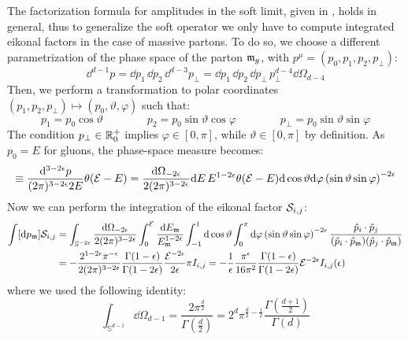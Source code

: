 The factorization formula for amplitudes in the soft limit, given in , holds in general, thus to generalize the soft operator we only have to compute integrated eikonal factors in the case of massive partons. To do so, we choose a different parametrization of the phase space of the parton $ \mathfrak{m}_g $, with $ p^\mu = (p_0 , p_1 , p_2 , p_\perp) $:
\begin{equation}
  \dd^{d-1} p = \dd p_1 \, \dd p_2 \, \dd^{d-3} p_\perp = \dd p_1 \, \dd p_2 \, \dd p_\perp \, p_\perp^{d-4} \dd \Omega_{d-4}
\end{equation}
Then, we perform a transformation to polar coordinates $ (p_1 , p_2 , p_\perp) \mapsto (p_0 , \vartheta , \varphi) $ such that:
\begin{equation}
  p_1 = p_0 \cos \vartheta
  \qquad \qquad
  p_2 = p_0 \sin \vartheta \cos \varphi
  \qquad \qquad
  p_\perp = p_0 \sin \vartheta \sin \varphi
\end{equation}
The condition $ p_\perp \in \mathbb{R}^+_0 $ implies $ \varphi \in [0,\pi] $, while $ \vartheta \in [0,\pi] $ by definition. As $ p_0 = E $ for gluons, the phase-space measure becomes:
\begin{equation}
  [\dd p] \equiv \frac{\dd^{3-2\de}p}{(2\pi)^{3-2\de}2E} \theta(\ema - E) = \frac{\dd \Omega_{-2\de}}{2(2\pi)^{3-2\de}} \dd E\, E^{1-2\de} \theta(\ema - E) \dd \cos \vartheta \dd \varphi \left( \sin \vartheta \sin \varphi \right)^{-2\de}
\end{equation}
Now we can perform the integration of the eikonal factor $ \mathcal{S}_{i,j} $:
\begin{equation*}
  \begin{split}
    \int [\mathrm{d} p_{\mathfrak{m}}] \mathcal{S}_{i,j}
    & = \int_{\mathbb{S}^{-2\epsilon}} \frac{\mathrm{d} \Omega_{-2\epsilon}}{2(2\pi)^{3-2\epsilon}} \int_0^{\mathcal{E}} \frac{\mathrm{d} E_{\mathfrak{m}}}{E_{\mathfrak{m}}^{1-2\epsilon}} \int_{-1}^1 \mathrm{d} \cos \vartheta \int_0^\pi \mathrm{d} \varphi \left( \sin \vartheta \sin \varphi \right)^{-2\epsilon} \frac{\hat{p}_i \cdot \hat{p}_j}{(\hat{p}_i \cdot \hat{p}_{\mathfrak{m}}) (\hat{p}_j \cdot \hat{p}_{\mathfrak{m}})} \\
    & = - \frac{2^{1-2\epsilon} \pi^{-\epsilon}}{2(2\pi)^{3-2\epsilon}} \frac{\Gamma(1-\epsilon)}{\Gamma(1-2\epsilon)} \frac{\mathcal{E}^{-2\epsilon}}{2\epsilon} \pi I_{i,j} = - \frac{1}{\epsilon} \frac{\pi^\epsilon}{16\pi^2} \frac{\Gamma(1-\epsilon)}{\Gamma(1-2\epsilon)} \mathcal{E}^{-2\epsilon} I_{i,j}(\epsilon)
  \end{split}
\end{equation*}
where we used the following identity:
\begin{equation}
  \int_{\mathbb{S}^{d-1}} \dd \Omega_{d-1} = \frac{2 \pi^{\frac{d}{2}}}{\Gamma(\frac{d}{2})} = 2^d \pi^{\frac{d}{2} - \frac{1}{2}} \frac{\Gamma\left( \frac{d+1}{2} \right)}{\Gamma(d)}
\end{equation}
